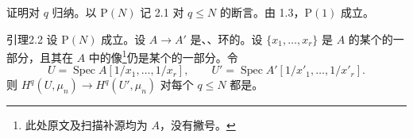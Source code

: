 证明对 $q$ 归纳。以 $\mathrm P(N)$ 记 2.1 对 $q\le N$ 的断言。由 1.3，$\mathrm P(1)$ 成立。
\begin{SGAresult}{引理}{2.2}
设 $\mathrm P(N)$ 成立。设 $A\to A'$ 是、、环的。设 $\{x_1,\ldots,x_r\}$ 是 $A$ 的某个的一部分，且其在 $A$ 中的像\footnote{此处原文及扫描补源均为 $A$，没有撇号。}仍是某个的一部分。令
\[U=\operatorname{Spec}A[1/x_1,\ldots,1/x_r],\qquad U'=\operatorname{Spec}A'[1/x'_1,\ldots,1/x'_r].\]
则 $H^q(U,\mu_n)\to H^q(U',\mu_n)$ 对每个 $q\le N$ 都是。
\end{SGAresult}
